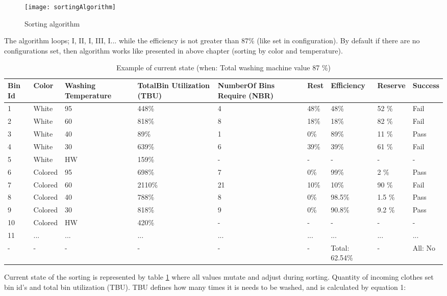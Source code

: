 \begin{figure}[h]
	\centering
		\texttt{[image: sortingAlgorithm]}
	\caption{Sorting algorithm}
	\label{fig:sortingAlgorithm}
\end{figure}

The algorithm loops;  I, II, I, III, I... while the efficiency is not greater than 87\% (like set in configuration). By default if there are no configurations set, then algorithm works like presented in above chapter (sorting by color and temperature).

\begin{table}[h]
	
    \begin{tabular}{ | p{0.4cm} | p{1cm} | p{2cm} | p{1.7cm} |p{2cm} |p{1cm} |p{1.3cm} |p{1.2cm} |p{1.3cm} |}
    \hline
	Bin Id & Color & Washing Temperature & TotalBin Utilization (TBU) & NumberOf Bins Require (NBR) & Rest & Efficiency & Reserve & Success\\ \hline
	1 & White & 95 & 448\% & 4 & 48\% & 48\% & 52 \% & Fail \\ \hline
	2 & White & 60 & 818\% & 8 & 18\% & 18\% & 82 \% & Fail \\ \hline
	3 & White & 40 & 89\% & 1 & 0\% & 89\% & 11 \% & Pass \\ \hline
	4 & White & 30 & 639\% & 6 & 39\% & 39\% & 61 \% & Fail \\ \hline
	5 & White & HW & 159\% & - & - & - & - & - \\ \hline
	6 & Colored & 95 & 698\% & 7 & 0\% & 99\% & 2 \% & Pass \\ \hline
	7 & Colored & 60 & 2110\% & 21 & 10\% & 10\% & 90 \% & Fail \\ \hline
	8 & Colored & 40 & 788\% & 8 & 0\% & 98.5\% & 1.5 \% & Pass \\ \hline
	9 & Colored & 30 & 818\% & 9 & 0\% & 90.8\% & 9.2 \% & Pass \\ \hline
	10 & Colored & HW & 420\% & - & - & - & - & - \\ \hline
	11 & ... & ... & ... & ... & ... & ... & ... & ... \\ \hline
	- & - & - & - & - & - & Total: 62.54\% & - & All: No \\ \hline
    \end{tabular}
	\caption{Example of current state (when: Total washing machine value 87 \%)}
	\label{tab:currentState}
\end{table}

\newpage

Current state of the sorting is represented by table \ref{tab:currentState} where all values mutate and adjust during sorting. Quantity of incoming clothes set bin id's and total bin utilization (TBU). TBU defines how many times it is needs to be washed, and is calculated by equation 1:

